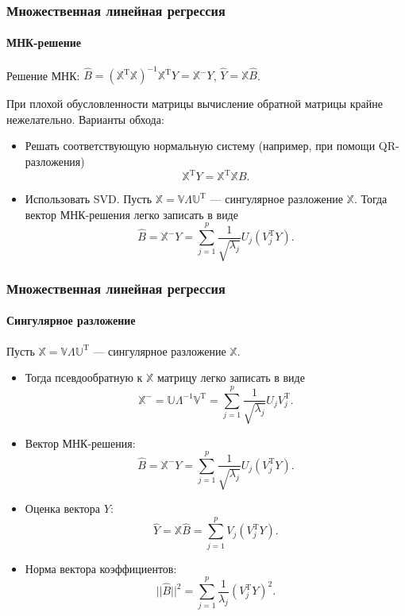 \documentclass[10pt,unicode, notheorems]{beamer}
\begin{document}
\begin{frame}
\frametitle{Множественная линейная регрессия}
\framesubtitle{МНК-решение}

Решение МНК: $\hat{B}=(\mathbb{X}^{\mathrm{T}}\mathbb{X})^{-1}\mathbb{X}^{\mathrm{T}}Y=\mathbb{X}^{-}Y$, 
$\hat{Y}=\mathbb{X}\hat{B}$.

При плохой обусловленности матрицы вычисление обратной матрицы крайне нежелательно. Варианты обхода:
\begin{itemize}
\item Решать соответствующую нормальную систему (например, при помощи QR-разложения)
\begin{equation*}
\mathbb{X}^{\mathrm{T}}Y=
\mathbb{X}^{\mathrm{T}}\mathbb{X}B.
\end{equation*}
\item Использовать SVD.
Пусть $\mathbb{X}=\mathbb{V}\mathbb{\Lambda}\mathbb{U^{\mathrm{T}}}$ --- сингулярное разложение $\mathbb{X}$.
 Тогда вектор МНК-решения легко записать в виде
\begin{equation*}
\hat{B}=\mathbb{X}^{-}Y
=
\sum_{j=1}^{p}
\frac{1}{\sqrt{\lambda_{j}}}
U_{j}(V_{j}^{\mathrm{T}}Y).
\end{equation*}
\end{itemize}
\end{frame}

\begin{frame}
\frametitle{Множественная линейная регрессия}
\framesubtitle{Сингулярное разложение}
Пусть $\mathbb{X}=\mathbb{V}\mathbb{\Lambda}\mathbb{U^{\mathrm{T}}}$ --- сингулярное разложение $\mathbb{X}$.
\begin{itemize}
\item Тогда псевдообратную к $\mathbb{X}$ матрицу легко записать в виде
\begin{equation*}
\mathbb{X}^{-}
=
\mathbb{U}\mathbb{\Lambda}^{-1}\mathbb{V}^{\mathrm{T}}
=
\sum_{j=1}^{p}
\frac{1}{\sqrt{\lambda_{j}}}
U_{j}V_{j}^{\mathrm{T}}.
\end{equation*}
\item Вектор МНК-решения:
\begin{equation*}
\hat{B}=\mathbb{X}^{-}Y
=
\sum_{j=1}^{p}
\frac{1}{\sqrt{\lambda_{j}}}
U_{j}(V_{j}^{\mathrm{T}}Y).
\end{equation*}
\item  Оценка вектора $Y$:
\begin{equation*}
\hat{Y}
=
\mathbb{X}\hat{B}
=
\sum_{j=1}^{p}
V_{j}(V_{j}^{\mathrm{T}}Y).
\end{equation*}
\item Норма вектора коэффициентов:
\begin{equation*}
||\hat{B}||^{2}
=
\sum_{j=1}^{p}
\frac{1}{\lambda_{j}}(V_{j}^{\mathrm{T}}Y)^{2}.
\end{equation*}
\end{itemize}
\end{frame}
\end{document}
